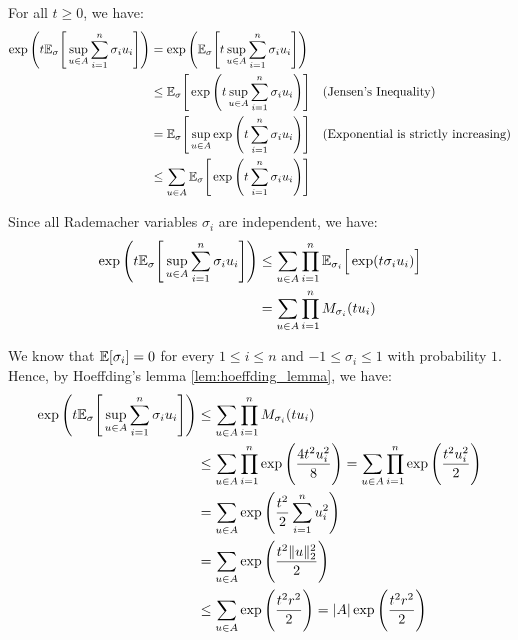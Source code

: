 \begin{proof*}
    For all $t\ge0$, we have:
    \begin{align*}
        \exp\Bigg( 
            t\mathbb{E}_\sigma\Bigg[ 
                \sup_{u\in A} \sum_{i=1}^n \sigma_i u_i
             \Bigg]
         \Bigg) &= \exp\Bigg( 
            \mathbb{E}_\sigma\Bigg[ 
                t\sup_{u\in A} \sum_{i=1}^n \sigma_i u_i
             \Bigg]
         \Bigg) \\
        &\le \mathbb{E}_\sigma \Bigg[ 
            \exp\Bigg( 
                t\sup_{u\in A} \sum_{i=1}^n \sigma_i u_i
             \Bigg)
         \Bigg] \ \ \ (\text{Jensen's Inequality}) \\
        &= \mathbb{E}_\sigma \Bigg[ 
            \sup_{u\in A} \exp\Bigg( 
                t\sum_{i=1}^n \sigma_i u_i
             \Bigg)
         \Bigg] \ \ \ (\text{Exponential is strictly increasing}) \\
        &\le \sum_{u \in A} \mathbb{E}_\sigma\Bigg[ 
            \exp\Bigg( 
                t\sum_{i=1}^n \sigma_i u_i
             \Bigg)
         \Bigg]
    \end{align*}

    \noindent Since all Rademacher variables $\sigma_i$ are independent, we have:
    \begin{align*}
        \exp\Bigg( 
            t\mathbb{E}_\sigma\Bigg[ 
                \sup_{u\in A} \sum_{i=1}^n \sigma_i u_i
             \Bigg]
         \Bigg) &\le \sum_{u \in A} \prod_{i=1}^n \mathbb{E}_{\sigma_i} \Big[ 
            \exp(t\sigma_iu_i)
         \Big] \\
        &= \sum_{u \in A} \prod_{i=1}^n M_{\sigma_i} (tu_i)
    \end{align*}

    \noindent We know that $\mathbb{E}[\sigma_i]=0$ for every $1\le i \le n$ and $-1\le \sigma_i \le 1$ with probability $1$. Hence, by Hoeffding's lemma \ref{lem:hoeffding_lemma}, we have:
    \begin{align*}
        \exp\Bigg( 
            t\mathbb{E}_\sigma\Bigg[ 
                \sup_{u\in A} \sum_{i=1}^n \sigma_i u_i
             \Bigg]
         \Bigg) &\le \sum_{u \in A} \prod_{i=1}^n M_{\sigma_i} (tu_i) \\
        &\le \sum_{u \in A} \prod_{i=1}^n \exp\Bigg( 
            \frac{4t^2u_i^2}{8}
         \Bigg) = \sum_{u \in A} \prod_{i=1}^n \exp\Bigg( 
            \frac{t^2u_i^2}{2}
         \Bigg) \\
        &=  \sum_{u \in A} \exp\Bigg( 
            \frac{t^2}{2}\sum_{i=1}^n u_i^2
         \Bigg) \\
        &=  \sum_{u \in A} \exp\Bigg( 
            \frac{t^2\|u\|_2^2}{2}
         \Bigg) \\
        &\le  \sum_{u \in A} \exp\Bigg( 
            \frac{t^2r^2}{2}
         \Bigg) = |A|\exp\Bigg( 
            \frac{t^2r^2}{2}
         \Bigg)
    \end{align*}


\end{proof*}
